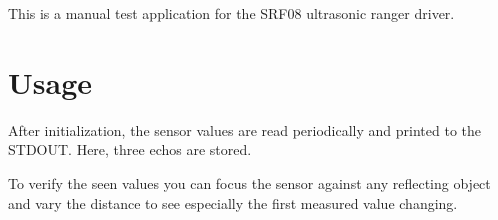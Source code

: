 This is a manual test application for the S\+R\+F08 ultrasonic ranger driver.

\section*{Usage}

After initialization, the sensor values are read periodically and printed to the S\+T\+D\+O\+UT. Here, three echos are stored.

To verify the seen values you can focus the sensor against any reflecting object and vary the distance to see especially the first measured value changing. 